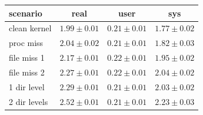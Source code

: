 \begin{table}
\centering
\begin{tabular}{ | l || c | c | c | }
\hline
scenario & real & user & sys \\
\hline
clean kernel & \begin{math} 1.99\pm0.01 \end{math} & \begin{math} 0.21\pm0.01 \end{math} & \begin{math} 1.77\pm0.02 \end{math} \\
proc miss & \begin{math} 2.04\pm0.02 \end{math} & \begin{math} 0.21\pm0.01 \end{math} & \begin{math} 1.82\pm0.03 \end{math} \\
file miss 1 & \begin{math} 2.17\pm0.01 \end{math} & \begin{math} 0.22\pm0.01 \end{math} & \begin{math} 1.95\pm0.02 \end{math} \\
file miss 2 & \begin{math} 2.27\pm0.01 \end{math} & \begin{math} 0.22\pm0.01 \end{math} & \begin{math} 2.04\pm0.02 \end{math} \\
1 dir level & \begin{math} 2.29\pm0.01 \end{math} & \begin{math} 0.21\pm0.01 \end{math} & \begin{math} 2.03\pm0.02 \end{math} \\
2 dir levels & \begin{math} 2.52\pm0.01 \end{math} & \begin{math} 0.21\pm0.01 \end{math} & \begin{math} 2.23\pm0.03 \end{math} \\

\end{tabular}
\end{table}
